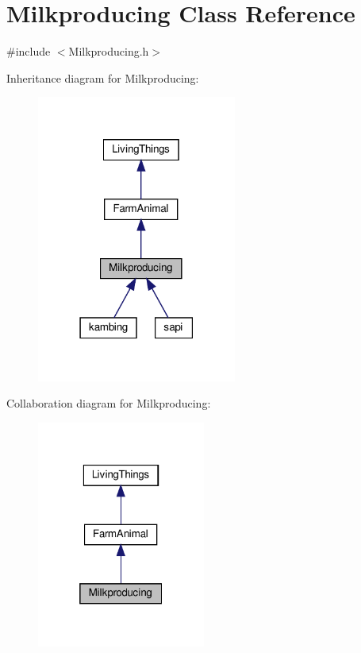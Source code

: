 \hypertarget{classMilkproducing}{}\section{Milkproducing Class Reference}
\label{classMilkproducing}


{\ttfamily \#include $<$Milkproducing.\+h$>$}



Inheritance diagram for Milkproducing\+:
\nopagebreak
\begin{figure}[H]
\begin{center}
\leavevmode
\includegraphics[width=186pt]{classMilkproducing__inherit__graph}
\end{center}
\end{figure}


Collaboration diagram for Milkproducing\+:
\nopagebreak
\begin{figure}[H]
\begin{center}
\leavevmode
\includegraphics[width=157pt]{classMilkproducing__coll__graph}
\end{center}
\end{figure}
